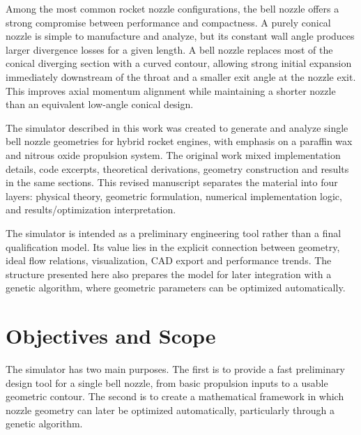 \documentclass[11pt,a4paper]{article}
\begin{document}
Among the most common rocket nozzle configurations, the bell nozzle offers a strong compromise between performance and compactness. A purely conical nozzle is simple to manufacture and analyze, but its constant wall angle produces larger divergence losses for a given length. A bell nozzle replaces most of the conical diverging section with a curved contour, allowing strong initial expansion immediately downstream of the throat and a smaller exit angle at the nozzle exit. This improves axial momentum alignment while maintaining a shorter nozzle than an equivalent low-angle conical design.

The simulator described in this work was created to generate and analyze single bell nozzle geometries for hybrid rocket engines, with emphasis on a paraffin wax and nitrous oxide propulsion system. The original work mixed implementation details, code excerpts, theoretical derivations, geometry construction and results in the same sections. This revised manuscript separates the material into four layers: physical theory, geometric formulation, numerical implementation logic, and results/optimization interpretation.

The simulator is intended as a preliminary engineering tool rather than a final qualification model. Its value lies in the explicit connection between geometry, ideal flow relations, visualization, CAD export and performance trends. The structure presented here also prepares the model for later integration with a genetic algorithm, where geometric parameters can be optimized automatically.


\section{Objectives and Scope}

The simulator has two main purposes. The first is to provide a fast preliminary design tool for a single bell nozzle, from basic propulsion inputs to a usable geometric contour. The second is to create a mathematical framework in which nozzle geometry can later be optimized automatically, particularly through a genetic algorithm.
\end{document}
